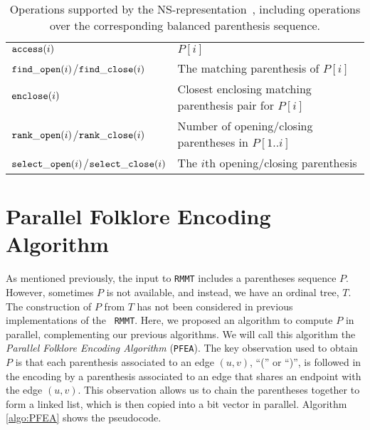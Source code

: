 \begin{table}[h]
\begin{center}
\begin{tabular} {|p{4.7cm}|p{7.2cm}|}
$\mathtt{access}(i)$                           &$P[i]$        \\ 
$\mathtt{find\_open}(i)$/$\mathtt{find\_close}(i)$       &The matching parenthesis of $P[i]$ \\
$\mathtt{enclose}(i)$                           &Closest enclosing matching parenthesis pair for $P[i]$ \\
$\mathtt{rank\_open}(i)$/$\mathtt{rank\_close}(i)$       &Number of opening/closing parentheses in $P[1..i]$\\
$\mathtt{select\_open}(i)$/$\mathtt{select\_close}(i)$   &The $i$th opening/closing parenthesis\\ \hline
\end{tabular}
\caption{Operations supported by the NS-representation~\cite{Navarro:2014:FFS:2620785.2601073}, including operations over the corresponding balanced parenthesis sequence.}
\label{tbl:operations}
\end{center}
\end{table}


\section{Parallel Folklore Encoding Algorithm}
\label{subsec:parenthesesAlgorithm}

As mentioned previously, the input to {\tt RMMT} includes a
parentheses sequence $P$. However, sometimes $P$ is not available,
and instead, we have an ordinal tree, $T$. The construction of $P$ from $T$
has not been considered in previous implementations of the {\tt
  RMMT}. Here, we proposed an algorithm to compute $P$ in parallel,
complementing our previous algorithms. We will call this algorithm the 
\emph{Parallel Folklore Encoding Algorithm} ({\tt PFEA}). The key
observation used to obtain $P$ is that each parenthesis associated to an
edge $(u,v)$, ``('' or ``)'', is followed in the encoding by a
parenthesis associated to an edge that shares an endpoint with the edge
$(u,v)$.
This observation allows us to chain the parentheses together to form a linked list, which is then copied into a bit vector in parallel. 
Algorithm \ref{algo:PFEA} shows the pseudocode.


